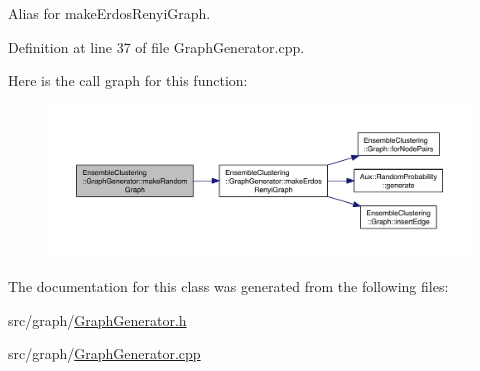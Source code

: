 Alias for make\-Erdos\-Renyi\-Graph. 



Definition at line 37 of file Graph\-Generator.\-cpp.



Here is the call graph for this function\-:
\nopagebreak
\begin{figure}[H]
\begin{center}
\leavevmode
\includegraphics[width=350pt]{class_ensemble_clustering_1_1_graph_generator_aec7e3e94b6e925077f7531da793a47a5_cgraph}
\end{center}
\end{figure}




The documentation for this class was generated from the following files\-:\begin{DoxyCompactItemize}
\item 
src/graph/\hyperlink{_graph_generator_8h}{Graph\-Generator.\-h}\item 
src/graph/\hyperlink{_graph_generator_8cpp}{Graph\-Generator.\-cpp}\end{DoxyCompactItemize}
